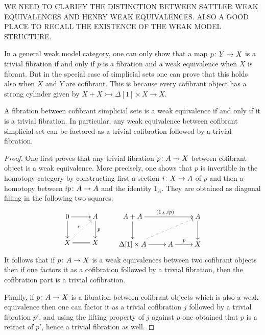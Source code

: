 \documentclass[reqno,10pt,a4paper,oneside,draft]{amsart}
\begin{document}
WE NEED TO CLARIFY THE DISTINCTION BETWEEN SATTLER WEAK EQUIVALENCES AND HENRY WEAK EQUIVALENCES. ALSO A GOOD PLACE TO RECALL THE EXISTENCE OF THE WEAK MODEL STRUCTURE.


\bigskip

In a general weak model category, one can only show that a map $p \colon Y \to X$ is a trivial fibration
if and only if $p$ is a fibration and a weak equivalence when $X$ is fibrant. But in the special case of simplicial sets one can prove that this holds also when $X$ and $Y$ are cofibrant. This is because every cofibrant object has a strong cylinder given by $X + X \rightarrowtail \Delta[1] \times X \rightarrow X$.

\begin{lemma}\label{lemma:triv_fib_are_we}
A fibration between cofibrant simplicial sets is a weak equivalence if and only if it is a trivial fibration.
In particular, any weak equivalence between cofibrant simplicial set can be factored as a trivial cofibration followed by a trivial fibration.
\end{lemma}

\begin{proof}
One first proves that any trivial fibration  $p \colon A \to X$ between cofibrant object is a weak equivalence. More precisely, one shows that $p$ is invertible in the homotopy category by constructing first a section $i \colon X \rightarrow A$ of $p$ and then a homotopy between $i  p \colon A \to A$ and the identity $1_{A}$. They are obtained as diagonal filling in the following two squares:
\[
\xymatrix{0 \ar[r] \ar[d] & A \ar[d]^{p} \\ 
X \ar@{.>}[ur]^{i} \ar@{=}[r] & X}
\qquad
\xymatrix{A + A \ar[rr]^{(1_{A} , i  p)} \ar[d] & &  A \ar[d] \\ \Delta[1] \times A \ar@{.>}[rru] \ar[r]& A \ar[r]^{p} & X  }
\]
It follows that if $p \colon A \rightarrow X$ is a weak equivalences between two cofibrant objects then if one factors it as a cofibration followed by a trivial fibration, then the cofibration part is a trivial cofibration. 

Finally, if $p \colon A \to X$ is a fibration between cofibrant objects which is also a weak equivalence then one can factor it as a trivial cofibration $j$ followed by a trivial fibration $p'$, and using the lifting property of $j$ against $p$ one obtained that $p$ is a retract of $p'$, hence a trivial fibration as well.
\end{proof}


\end{document}
